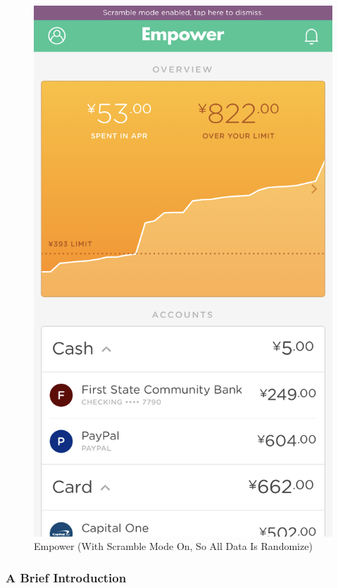 \documentclass[xclolor=dvipsnames]{beamer}            %
\begin{document}
\begin{darkframes}
\begin{frame}
        \begin{figure}[H]
            \centering
            \includegraphics[height=.65\textheight]{assets/empower.png}
            \caption{Empower (With Scramble Mode On, So All Data Is Randomize)}
            \label{fig:empower}
        \end{figure}
    \end{frame}

    \begin{frame}
        \frametitle{A Brief Introduction}
        \subtitle{Acorns}


\end{frame}
\end{darkframes}
\end{document}
